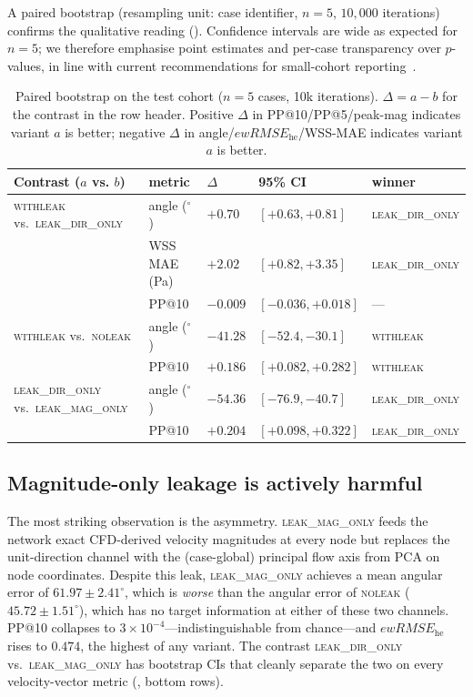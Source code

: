 \documentclass[10pt,a4paper]{article}
\newcommand{\withleak}{\textsc{withleak}}
\newcommand{\dironly}{\textsc{leak\_dir\_only}}
\newcommand{\magonly}{\textsc{leak\_mag\_only}}
\newcommand{\noleak}{\textsc{noleak}}
\newcommand{\ewRMSE}{ewRMSE_{\text{he}}}
\begin{document}
A paired bootstrap (resampling unit: case identifier, $n=5$,
$10{,}000$ iterations) confirms the qualitative reading
(). Confidence intervals are wide as expected for
$n=5$; we therefore emphasise point estimates and per-case
transparency over $p$-values, in line with current recommendations for
small-cohort
reporting~\cite{kapoor2023leakage,alzheimer2025scoping}.

\begin{table}[h]
\small
\centering
\caption{Paired bootstrap on the test cohort ($n=5$ cases, 10k
iterations). $\Delta = a - b$ for the contrast in the row header.
Positive $\Delta$ in PP@10/PP@5/peak-mag indicates variant $a$ is
better; negative $\Delta$ in angle/$\ewRMSE$/WSS-MAE indicates
variant $a$ is better.}
\label{tab:bootstrap}
\begin{tabularx}{\linewidth}{lXXXX}
\toprule
Contrast ($a$ vs. $b$) & metric & $\Delta$ & 95\% CI & winner \\
\midrule
\withleak{} vs.\ \dironly{}
 & angle ($^\circ$) & $+0.70$ & $[+0.63, +0.81]$ & \dironly{} \\
 & WSS MAE (Pa)     & $+2.02$ & $[+0.82, +3.35]$ & \dironly{} \\
 & PP@10            & $-0.009$ & $[-0.036, +0.018]$ & ---       \\
\midrule
\withleak{} vs.\ \noleak{}
 & angle ($^\circ$) & $-41.28$ & $[-52.4, -30.1]$ & \withleak{} \\
 & PP@10            & $+0.186$ & $[+0.082, +0.282]$ & \withleak{} \\
\midrule
\dironly{} vs.\ \magonly{}
 & angle ($^\circ$) & $-54.36$ & $[-76.9, -40.7]$ & \dironly{} \\
 & PP@10            & $+0.204$ & $[+0.098, +0.322]$ & \dironly{} \\
\bottomrule
\end{tabularx}
\end{table}

\subsection*{Magnitude-only leakage is actively harmful}

The most striking observation is the asymmetry. \magonly{} feeds the
network exact CFD-derived velocity magnitudes at every node but
replaces the unit-direction channel with the (case-global) principal
flow axis from PCA on node coordinates. Despite this leak, \magonly{}
achieves a mean angular error of $61.97 \pm 2.41^\circ$, which is
\emph{worse} than the angular error of \noleak{} ($45.72 \pm
1.51^\circ$), which has no target information at either of these two
channels. PP@10 collapses to $3\!\times\!10^{-4}$---indistinguishable
from chance---and $\ewRMSE$ rises to $0.474$, the highest of any
variant. The contrast \dironly{} vs.\ \magonly{} has bootstrap
CIs that cleanly separate the two on every velocity-vector metric
(, bottom rows).
\end{document}
